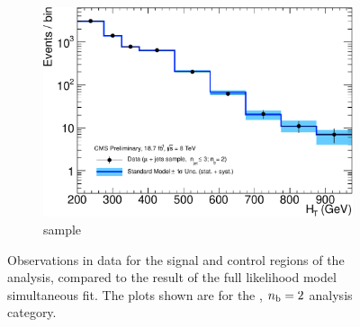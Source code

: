 \begin{figure}[h!]
\begin{subfigure}[b]{0.48\textwidth}
    \includegraphics[width=\textwidth]
    {Figs/results/v0/blueBand/single_plots/muon_2b_le3j_logy.pdf}
    \caption{\mj sample}
  \end{subfigure}
  \caption{Observations in data for the signal and control
  regions of the analysis, compared to the result of the full likelihood model
  simultaneous fit. The plots shown are for the \njlow, $n_{\text{b}} = 2$ analysis category.}
  \label{fig:blue_fits_2b_le3j}
\end{figure}

